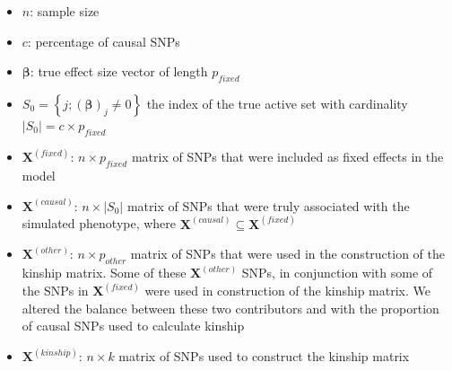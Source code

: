 \documentclass[12pt,letter]{article}\usepackage[]{graphicx}\usepackage[]{color}
\newcommand{\bX}{\textbf{X}}
\newcommand{\bbeta}{\boldsymbol{\beta}}
\begin{document}
\begin{itemize}
	\item $n$: sample size
	\item $c$: percentage of causal SNPs
	\item $\bbeta$: true effect size vector of length $p_{fixed}$ 
	\item $S_0 = \left\lbrace j; (\bbeta)_j \neq 0 \right\rbrace$ the index of the true active set with cardinality $ |S_0| = c\times p_{fixed}$
	
	\item $\bX^{(fixed)}$: $n \times p_{fixed}$ matrix of SNPs that were included as fixed effects in the model
	\item $\bX^{(causal)}$: $n \times |S_0|$ matrix of SNPs that were truly associated with the simulated phenotype, where $\bX^{(causal)} \subseteq \bX^{(fixed)}$
	\item $\bX^{(other)}$: $n \times p_{other}$ matrix of SNPs that were used in the construction of the kinship matrix. Some of these $\bX^{(other)}$ SNPs, in conjunction with some of the SNPs in $\bX^{(fixed)}$ were used in construction of the kinship matrix. We altered the balance between these two contributors and with the proportion of causal SNPs used to calculate kinship
	\item $\bX^{(kinship)}$: $n \times k$ matrix of SNPs used to construct the kinship matrix
	
\end{itemize}
\end{document}
